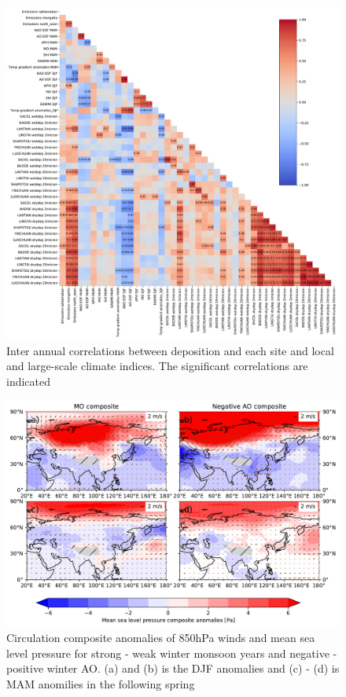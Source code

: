 \begin{figure}[htpb]
    \centering
    \includegraphics[width=\textwidth]{../figs/correlations.pdf}
    \caption{Inter annual correlations between deposition and each site and local and large-scale climate indices. The significant correlations are indicated}
    \label{fig:correlations}
\end{figure}


\begin{figure}
    \centering
    \includegraphics[width=\textwidth]{texfiles/figs/winter_MO_AO_composite.pdf}
    \caption{Circulation composite anomalies of 850hPa winds and mean sea level pressure for strong - weak winter monsoon years and negative - positive winter AO. (a) and (b) is the DJF anomalies and (c) - (d) is MAM anomilies in the following spring}
    \label{fig:mo_ao_composite}
\end{figure}

